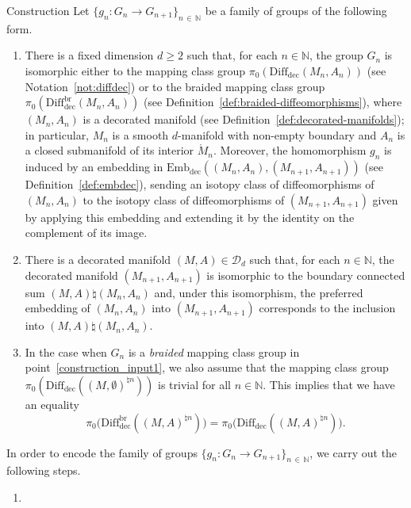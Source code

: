 \documentclass[AHL,Unicode,published]{cedram}
\newcommand{\Int}{\mathring}
\newcommand{\rdec}{\mathrm{dec}}
\newcommand{\cD}{\mathcal{D}}
\newcommand{\bN}{\mathbb{N}}
\newcommand{\diffdec}{\ensuremath{\mathrm{Diff}_{\rdec}}}
\newcommand{\diffdecbr}{\ensuremath{\mathrm{Diff}_{\rdec}^{\mathrm{br}}}}
\newcommand{\embdec}{\ensuremath{\mathrm{Emb}_{\rdec}}}
\renewcommand{\geq}{\geqslant}
\newcommand*{\romanenumi}{\renewcommand*{\theenumi}{\roman{enumi}}}
\begin{document}
\begin{enonce}
{Construction}\label{const:category_families_of_groups}
Let $\{g_{n}\colon G_{n}\to G_{n+1}\}_{n\,\in\,\bN}$ be a family of groups of the following form.
\begin{enumerate}\romanenumi
\item\label{construction_input1}
There is a fixed dimension $d\geq 2$ such that, for each $n\in\bN$, the group $G_{n}$ is isomorphic either to the mapping class group $\pi_{0}(\diffdec(M_{n},A_{n}))$ (see Notation~\ref{not:diffdec}) or to the braided mapping class group $\pi_{0}(\diffdecbr(M_{n},A_{n}))$ (see Definition~\ref{def:braided-diffeomorphisms}), where $(M_{n},A_{n})$ is a decorated manifold (see Definition~\ref{def:decorated-manifolds}); in particular, $M_{n}$ is a smooth $d$-manifold with non-empty boundary and $A_{n}$ is a closed submanifold of its interior $\Int{M}_{n}$. Moreover, the homomorphism $g_{n}$ is induced by an embedding in $\embdec((M_{n},A_{n}),(M_{n+1},A_{n+1}))$ (see Definition~\ref{def:embdec}), sending an isotopy class of diffeomorphisms of $(M_{n},A_{n})$ to the isotopy class of diffeomorphisms of $(M_{n+1},A_{n+1})$ given by applying this embedding and extending it by the identity on the complement of its image.
\item\label{construction_input2}
There is a decorated manifold $(M,A)\in\cD_{d}$ such that, for each $n\in\bN$, the decorated manifold $(M_{n+1},A_{n+1})$ is isomorphic to the boundary connected sum $(M,A) \natural (M_{n},A_{n})$ and, under this isomorphism, the preferred embedding of $(M_{n},A_{n})$ into $(M_{n+1},A_{n+1})$ corresponds to the inclusion into $(M,A) \natural (M_{n},A_{n})$.
\item\label{construction_input3}
In the case when $G_n$ is a \emph{braided} mapping class group in point~\ref{construction_input1}, we also assume that the mapping class group $\pi_0(\diffdec((M,\emptyset)^{\natural n}))$ is trivial for all $n \in \bN$. This implies that we have an equality
\[
\pi_{0}\big(\diffdecbr\left((M,A)^{\natural n}\right)\big) = \pi_{0}\big(\diffdec\left((M,A)^{\natural n}\right)\big).
\]
\end{enumerate}
In order to encode the family of groups $\{g_{n}\colon G_{n}\to G_{n+1}\}_{n\,\in\,\bN}$, we carry out the following steps.
\begin{enumerate}
\item\label{construction_step1}

\end{enumerate}
\end{enonce}
\end{document}
